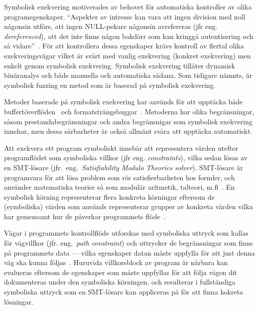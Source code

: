


Symbolisk exekvering motiverades av behovet för automatiska kontroller av olika
programegenskaper. ``Aspekter av intresse kan vara att ingen division med
noll någonsin utförs, att ingen NULL-pekare någonsin avrefereras (jfr eng.
\emph{dereferenced}), att det inte finns någon bakdörr som kan kringgå
autentisering och så vidare''~\cite{survey_symb_exc}. För att kontrollera dessa
egenskaper krävs kontroll av flertal olika exekveringsvägar vilket är svårt med
vanlig exekvering (konkret exekvering) men enkelt genom symbolisk exekvering.
Symbolisk exekvering tillåter dynamisk binäranalys och både manuella och
automatiska sådana. Som tidigare nämnts, är symbolisk fuzzing en metod som är baserad på symbolisk
exekvering.


Metoder baserade på symbolisk exekvering har används för att upptäcka både
buffertöverflöden~\cite{bofaeg} och formatsträngsbuggar~\cite{vakkaupad15}.
Metoderna har olika begränsningar, såsom prestandabegränsningar och andra
begränsnigar som symbolisk exekvering innehar, men dessa sårbarheter är också
allmänt svåra att upptäcka automatiskt.

Att exekvera ett program symboliskt innebär att representera värden utefter
programflödet som symboliska villkor (jfr eng. \emph{constraints}), vilka sedan
lösas av en SMT-lösare (jfr.\ eng.\ \emph{Satisfiability Modulo Theories solver}). SMT-lösare är programvara för att
lösa problem som rör satisfierbarheten hos formler, och använder matematiska teorier så
som modulär aritmetik, talteori, m.fl~\cite{symqemu}. %
En symbolisk körning representerar flera konkreta körningar eftersom de (symboliska) värden som
används representerar grupper av konkreta värden vilka har gemensamt hur de
påverkar programmets flöde~\cite{klee}.

Vägar i programmets kontrollflöde utforskas med symboliska uttryck som kallas
för vägvillkor (jfr. eng.\ \emph{path constraint}) och uttrycker de begränsningar som finns på
programmets data --- vilka egenskaper datan måste uppfylla för att just denna väg
ska kunna följas~\cite{klee}. Huruvida villkorsblock av program är nårbara kan
evalueras eftersom de egenskaper som måste uppfyllas för att följa vägen dit dokumenteras
under den symboliska körningen, och resulterar i fullständiga symboliska uttryck som en
SMT-lösare kan appliceras på för att finna kokreta lösningar.

